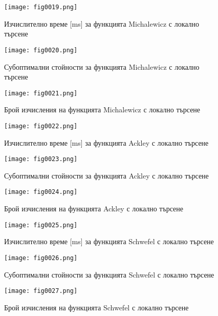 \begin{figure}[H]
  \centering
  \texttt{[image: fig0019.png]}
  \caption{Изчислително време [ms] за функцията Michalewicz с локално търсене}
\label{fig0019}
\end{figure}

\begin{figure}[H]
  \centering
  \texttt{[image: fig0020.png]}
  \caption{Субоптимални стойности за функцията Michalewicz с локално търсене}
\label{fig0020}
\end{figure}

\begin{figure}[H]
  \centering
  \texttt{[image: fig0021.png]}
  \caption{Брой изчисления на функцията Michalewicz с локално търсене}
\label{fig0021}
\end{figure}

\begin{figure}[H]
  \centering
  \texttt{[image: fig0022.png]}
  \caption{Изчислително време [ms] за функцията Ackley с локално търсене}
\label{fig0022}
\end{figure}

\begin{figure}[H]
  \centering
  \texttt{[image: fig0023.png]}
  \caption{Субоптимални стойности за функцията Ackley с локално търсене}
\label{fig0023}
\end{figure}

\begin{figure}[H]
  \centering
  \texttt{[image: fig0024.png]}
  \caption{Брой изчисления на функцията Ackley с локално търсене}
\label{fig0024}
\end{figure}

\begin{figure}[H]
  \centering
  \texttt{[image: fig0025.png]}
  \caption{Изчислително време [ms] за функцията Schwefel с локално търсене}
\label{fig0025}
\end{figure}

\begin{figure}[H]
  \centering
  \texttt{[image: fig0026.png]}
  \caption{Субоптимални стойности за функцията Schwefel с локално търсене}
\label{fig0026}
\end{figure}

\begin{figure}[H]
  \centering
  \texttt{[image: fig0027.png]}
  \caption{Брой изчисления на функцията Schwefel с локално търсене}
\label{fig0027}
\end{figure}

